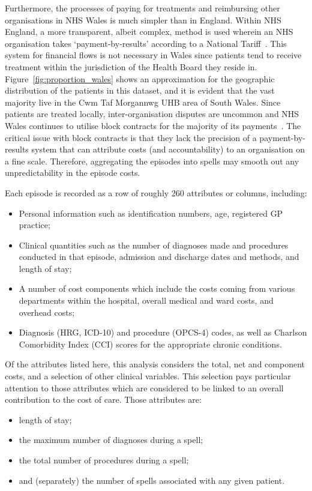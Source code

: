 Furthermore, the processes of paying for treatments and reimbursing other
organisations in NHS Wales is much simpler than in England. Within NHS England,
a more transparent, albeit complex, method is used wherein an NHS organisation
takes `payment-by-results' according to a National Tariff~\cite{BMA2020,UK2011}.
This system for financial flows is not necessary in Wales since patients tend to
receive treatment within the jurisdiction of the Health Board they reside in.
Figure~\ref{fig:proportion_wales} shows an approximation for the geographic
distribution of the patients in this dataset, and it is evident that the vast
majority live in the Cwm Taf Morgannwg UHB area of South Wales. Since patients
are treated locally, inter-organisation disputes are uncommon and NHS Wales
continues to utilise block contracts for the majority of its
payments~\cite{BMA2020}. The critical issue with block contracts is that they
lack the precision of a payment-by-results system that can attribute costs (and
accountability) to an organisation on a fine scale. Therefore, aggregating the
episodes into spells may smooth out any unpredictability in the episode costs.

Each episode is recorded as a row of roughly 260 attributes or columns,
including:
\begin{itemize}
    \item Personal information such as identification numbers, age, registered
        GP practice;
    \item Clinical quantities such as the number of diagnoses made and
        procedures conducted in that episode, admission and discharge dates and
        methods, and length of stay;
    \item A number of cost components which include the costs coming from
        various departments within the hospital, overall medical and ward costs,
        and overhead costs;
    \item Diagnosis (HRG, ICD-10) and procedure (OPCS-4) codes, as well as
        Charlson Comorbidity Index (CCI) scores for the appropriate chronic
        conditions.
\end{itemize}

Of the attributes listed here, this analysis considers the total, net and
component costs, and a selection of other clinical variables. This selection
pays particular attention to those attributes which are considered to be linked
to an overall contribution to the cost of care. Those attributes are: 

\begin{itemize}
    \item length of stay; 
    \item the maximum number of diagnoses during a spell;
    \item the total number of procedures during a spell;
    \item and (separately) the number of spells associated with any given
        patient.
\end{itemize}

